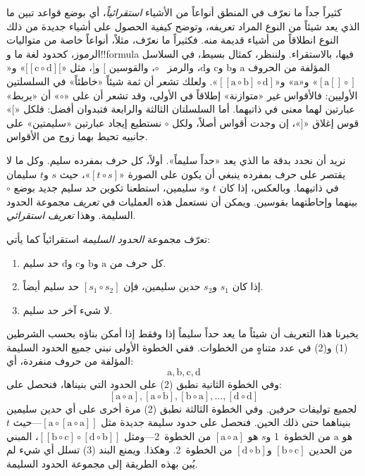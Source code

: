 \documentclass[../../../include/open-logic-section]{subfiles}
\begin{document}


كثيراً جداً ما نعرّف في المنطق أنواعاً من الأشياء \emph{استقرائياً}،
أي بوضع قواعد تبين ما الذي يعد شيئاً من النوع المراد تعريفه، وتوضح كيفية
الحصول على أشياء جديدة من ذلك النوع انطلاقاً من أشياء قديمة منه. فكثيراً
ما نعرّف، مثلاً، أنواعاً خاصة من متواليات الرموز، كحدود لغة ما
و!!{formula} فيها، بالاستقراء. ولننظر، كمثال بسيط، في السلاسل المؤلفة من
الحروف $\mathrm{a}$ و$\mathrm{b}$ و$\mathrm{c}$ و$\mathrm{d}$، والرمز
~$\circ$، والقوسين $[$ و$]$، مثل
«$[[\mathrm{c} \circ \mathrm{d}][$» و«$[\mathrm{a}[]\circ]$»
و«$\mathrm{a}$» و«$[[\mathrm{a} \circ \mathrm{b}]\circ
\mathrm{d}]$». ولعلك تشعر أن ثمة شيئاً «خاطئاً» في السلسلتين الأوليين:
فالأقواس غير «متوازنة» إطلاقاً في الأولى، وقد تشعر أن على «$\circ$» أن
«يربط» عبارتين لهما معنى في ذاتيهما. أما السلسلتان الثالثة والرابعة
فتبدوان أفضل: فلكل «$[$» قوس إغلاق «$]$»، إن وجدت أقواس أصلاً، ولكل
$\circ$ نستطيع إيجاد عبارتين «سليمتين» على جانبيه تحيط بهما زوج من
الأقواس.

نريد أن نحدد بدقة ما الذي يعد «حداً سليماً». أولاً، كل حرف بمفرده سليم.
وكل ما لا يقتصر على حرف بمفرده ينبغي أن يكون على الصورة
«$[t \circ s]$»، حيث $s$ و$t$ سليمان في ذاتيهما. وبالعكس، إذا كان
$t$ و$s$ سليمين، استطعنا تكوين حد سليم جديد بوضع $\circ$ بينهما
وإحاطتهما بقوسين. ويمكن أن نستعمل هذه العمليات في \emph{تعريف} مجموعة
الحدود السليمة. وهذا \emph{تعريف استقرائي}.

\begin{defn}
  تعرّف مجموعة \emph{الحدود السليمة} استقرائياً كما يأتي:
  \begin{enumerate}
  \item كل حرف من $\mathrm{a}$ و$\mathrm{b}$ و$\mathrm{c}$
    و$\mathrm{d}$ حد سليم.
  \item إذا كان $s_1$ و$s_2$ حدين سليمين، فإن
    $[s_1 \circ s_2]$ حد سليم أيضاً.
  \item لا شيء آخر حد سليم.
  \end{enumerate}
\end{defn}

يخبرنا هذا التعريف أن شيئاً ما يعد حداً سليماً إذا وفقط إذا أمكن بناؤه
بحسب الشرطين (1) و(2) في عدد متناهٍ من الخطوات. ففي الخطوة الأولى نبني
جميع الحدود السليمة المؤلفة من حروف منفردة، أي:
\[
\mathrm{a}, \mathrm{b}, \mathrm{c}, \mathrm{d}
\]
وفي الخطوة الثانية نطبق (2) على الحدود التي بنيناها، فنحصل على:
\[
[\mathrm{a} \circ \mathrm{a}], [\mathrm{a} \circ \mathrm{b}],
[\mathrm{b} \circ \mathrm{a}], \dots, [\mathrm{d} \circ \mathrm{d}]
\]
لجميع توليفات حرفين. وفي الخطوة الثالثة نطبق (2) مرة أخرى على أي حدين
سليمين بنيناهما حتى ذلك الحين. فنحصل على حدود سليمة جديدة مثل
$[\mathrm{a} \circ [\mathrm{a} \circ \mathrm{a}]]$---حيث $t$ هو
$\mathrm{a}$ من الخطوة~1 و$s$ هو
$[\mathrm{a} \circ \mathrm{a}]$ من الخطوة~2---ومثل
$[[\mathrm{b} \circ \mathrm{c}] \circ [\mathrm{d} \circ
\mathrm{b}]]$، المبني من الحدين $[\mathrm{b} \circ \mathrm{c}]$
و$[\mathrm{d} \circ \mathrm{b}]$ من الخطوة~2. وهكذا. ويمنع البند (3)
تسلل أي شيء لم يُبن بهذه الطريقة إلى مجموعة الحدود السليمة.
\end{document}
